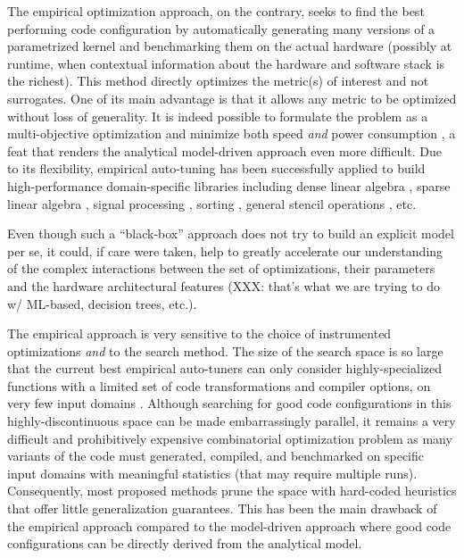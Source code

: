 \documentclass{sig-alternate}
\begin{document}

The empirical optimization approach, on the contrary, seeks to find the best
performing code configuration by automatically generating many versions of a
parametrized kernel and benchmarking them on the actual hardware (possibly at
runtime, when contextual information about the hardware and software stack is
the richest). This method directly optimizes the metric(s) of interest and not
surrogates. One of its main advantage is that it allows any metric to be
optimized without loss of generality. It is indeed possible to formulate the
problem as a multi-objective optimization and minimize both speed \emph{and}
power consumption \citep{rahman2011automated}, a feat that renders the
analytical model-driven approach even more difficult. Due to its flexibility,
empirical auto-tuning has been successfully applied to build high-performance
domain-specific libraries including dense linear algebra
\citep{clint2001automated, bilmes1997optimizing}, sparse linear algebra
\citep{vuduc2005oski}, signal processing \citep{frigo1998fftw}, sorting
\citep{li2004dynamically}, general stencil operations \citep{kamil2010auto}, etc.

Even though such a ``black-box'' approach does not try to build an
explicit model per se, it could, if care were taken, help to greatly accelerate
our understanding of the complex interactions between the set of optimizations,
their parameters and the hardware architectural features (XXX: that's what
we are trying to do w/ ML-based, decision trees, etc.).


The empirical approach is very sensitive to the choice of instrumented
optimizations \emph{and} to the search method. The size of the search space is
so large that the current best empirical auto-tuners can only consider
highly-specialized functions with a limited set of code transformations and
compiler options, on very few input domains \citep{ganapathi2009case}. Although
searching for good code configurations in this highly-discontinuous space can
be made embarrassingly parallel, it remains a very difficult and prohibitively
expensive combinatorial optimization problem as many variants of the code must
generated, compiled, and benchmarked on specific input domains with meaningful
statistics (that may require multiple runs). Consequently, most proposed
methods prune the space with hard-coded heuristics that offer little
generalization guarantees. This has been the main drawback of the empirical
approach compared to the model-driven approach where good code configurations
can be directly derived from the analytical model.
\end{document}
